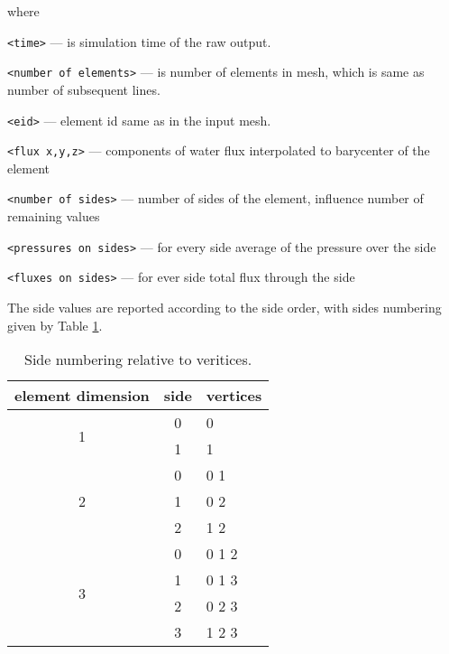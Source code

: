 where 
\begin{description}
 \item \verb'<time>' --- is simulation time of the raw output.
 \item \verb'<number of elements>' --- is number of elements in mesh, which is same as number of subsequent lines.
 \item \verb'<eid>' --- element id same as in the input mesh.
 \item \verb'<flux x,y,z>' --- components of water flux interpolated to barycenter of the element
 \item \verb'<number of sides>' --- number of sides of the element, influence number of remaining values
 \item \verb'<pressures on sides>' --- for every side average of the pressure over the side
 \item \verb'<fluxes on sides>' --- for ever side total flux through the side 
\end{description}

The side values are reported according to the side order, with sides numbering given by Table \ref{tab:side-numbers}.
\begin{table}[h]
    \caption{Side numbering relative to veritices.}
    \label{tab:side-numbers}
    \begin{tabular}{ccl}
        \toprule
        element dimension   &   side       &   vertices \\
        \toprule
        \multirow{2}{*}{1}  &   0          &   0  \\
                            &   1          &   1  \\
        \midrule
        \multirow{3}{*}{2}  &   0          &   0 1  \\
                            &   1          &   0 2  \\
                            &   2          &   1 2  \\    
        \midrule
        \multirow{4}{*}{3}  &   0          &   0 1 2 \\
                            &   1          &   0 1 3 \\
                            &   2          &   0 2 3 \\
                            &   3          &   1 2 3 \\    
        \bottomrule
    \end{tabular}    
\end{table}

